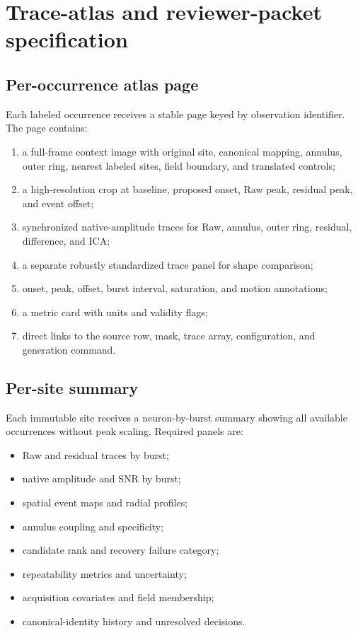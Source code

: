 \section{Trace-atlas and reviewer-packet specification}
\label{sec:supp-atlas}

\subsection{Per-occurrence atlas page}

Each labeled occurrence receives a stable page keyed by observation identifier. The page contains:
\begin{enumerate}
  \item a full-frame context image with original site, canonical mapping, annulus, outer ring, nearest labeled sites, field boundary, and translated controls;
  \item a high-resolution crop at baseline, proposed onset, Raw peak, residual peak, and event offset;
  \item synchronized native-amplitude traces for Raw, annulus, outer ring, residual, difference, and ICA;
  \item a separate robustly standardized trace panel for shape comparison;
  \item onset, peak, offset, burst interval, saturation, and motion annotations;
  \item a metric card with units and validity flags;
  \item direct links to the source row, mask, trace array, configuration, and generation command.
\end{enumerate}


\subsection{Per-site summary}

Each immutable site receives a neuron-by-burst summary showing all available occurrences without peak scaling. Required panels are:
\begin{itemize}
  \item Raw and residual traces by burst;
  \item native amplitude and SNR by burst;
  \item spatial event maps and radial profiles;
  \item annulus coupling and specificity;
  \item candidate rank and recovery failure category;
  \item repeatability metrics and uncertainty;
  \item acquisition covariates and field membership;
  \item canonical-identity history and unresolved decisions.
\end{itemize}

